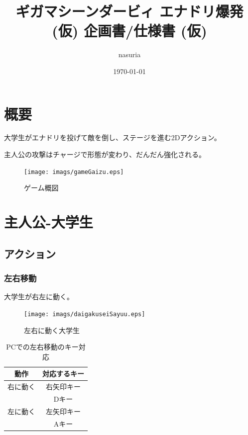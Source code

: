 \documentclass[12pt]{jsarticle}
\begin{document}
\title{
  ギガマシーンダービィ \linebreak{}
  エナドリ爆発 (仮) \linebreak{}
  企画書/仕様書 (仮)
}
\author{nasuria}
\date{\today}
\maketitle
\newpage

\tableofcontents
\newpage


\section{概要}
大学生がエナドリを投げて敵を倒し、ステージを進む2Dアクション。

主人公の攻撃はチャージで形態が変わり、だんだん強化される。

\begin{figure}[htbp]
  \begin{center}
    \texttt{[image: imags/gameGaizu.eps]}
    \caption{ゲーム概図}
  \end{center}
\end{figure}

\newpage

\section{主人公-大学生}
\subsection{アクション}
\subsubsection{左右移動}

大学生が右左に動く。

\begin{figure}[htbp]
  \begin{center}
    \texttt{[image: imags/daigakuseiSayuu.eps]}
    \caption{左右に動く大学生}
  \end{center}
\end{figure}

\begin{table}[htbp]
  \centering
  \caption{PCでの左右移動のキー対応}
  \begin{tabular}{c|c}
    \hline
    動作 & 対応するキー \\
    \hline
    右に動く & 右矢印キー \\
      & Dキー \\
    \hline
    左に動く & 左矢印キー \\
      & Aキー \\
    \hline
  \end{tabular}
\end{table}
\end{document}
